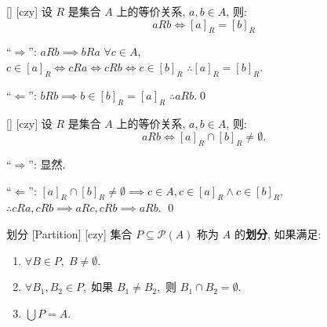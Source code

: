 \documentclass[UTF8]{ctexart}
\begin{document}
        \begin{thm}
            [UUID]
            {}
            []
            [czy]
            设 \( R \) 是集合 \( A \) 上的等价关系, \( a, b \in A \), 则: 
            \[
            a R b \iff {[a]}_R = {[b]}_R
            \]
        \end{thm}
            
        \begin{prf}

                “\(\Rightarrow\)”:  \( a R b \implies b R a \) \( \forall c \in A \),\\
                \(
                c \in {[a]}_R \iff c R a \iff c R b \iff c \in {[b]}_R
                \)
                \( \therefore {[a]}_R = {[b]}_R \).

                “\(\Leftarrow\)”: \( b R b \implies  b \in {[b]}_R = {[a]}_R \) \( \therefore a R b \).\qed
        \end{prf}

        \begin{ppt}
            [UUID]
            {}
            []
            [czy]
            设 \( R \) 是集合 \( A \) 上的等价关系, \( a, b \in A \), 则: 
            \[
            a R b \iff {[a]}_R \cap {[b]}_R \neq \emptyset.
            \]
        \end{ppt}
        
        \begin{prf}
                “\(\Rightarrow\)”: 显然. 

                “\(\Leftarrow\)”: \( {[a]}_R \cap {[b]}_R \neq \emptyset \implies c \in A, c \in {[a]}_R \land c \in {[b]}_R \),\\
                \(
                \therefore c R a, c R b \implies a R c, c R b \implies a R b.
                \)
                \qed            
        \end{prf}

        \begin{dfn}
            [UUID]
            {划分}
            [Partition]
            [czy]
            集合 \( P \subseteq \mathcal{P}(A) \) 称为 \( A \) 的\textbf{划分}, 如果满足: 
            \begin{enumerate}
                \item \( \forall B \in P, \; B \neq \emptyset \). 
                \item \( \forall B_1, B_2 \in P, \; \text{如果 } B_1 \neq B_2, \text{ 则 } B_1 \cap B_2 = \emptyset \). 
                \item \( \bigcup P = A \). 
            \end{enumerate}
        \end{dfn}
\end{document}
